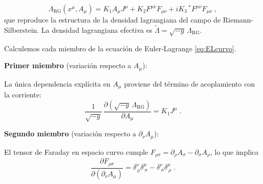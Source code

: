             \begin{equation}\label{eq:LagRS_RG}
                \Lambda_{\text{RG}}(x^{\mu},A_{\mu}) = K_1 A_{\mu}J^{\mu} + K_2 F^{\mu\nu}F_{\mu\nu} + iK_3\,{}^{*}F^{\mu\nu}F_{\mu\nu}\;,
            \end{equation}
            que reproduce la estructura de la densidad lagrangiana del campo de Riemann-Silberstein.  La densidad lagrangiana efectiva es $\tilde{\Lambda} = \sqrt{-g}\,\Lambda_{\text{RG}}$.

            Calculemos cada miembro de la ecuación de Euler-Lagrange \eqref{eq:ELcurvo}.

            \vspace{4pt}
            \noindent\textbf{Primer miembro} (variación respecto a $A_{\mu}$):

            La única dependencia explícita en $A_{\mu}$ proviene del término de acoplamiento
            con la corriente:
            \begin{equation}\label{eq:EL1}
                \frac{1}{\sqrt{-g}}\,
                \frac{\partial(\sqrt{-g}\,\Lambda_{\text{RG}})}{\partial A_{\mu}}
                = K_1 J^{\mu}\;.
            \end{equation}

            \vspace{4pt}
            \noindent\textbf{Segundo miembro} (variación respecto a $\partial_{\nu}A_{\mu}$):

            El tensor de Faraday en espacio curvo cumple $F_{\rho\sigma}=\partial_{\rho}A_{\sigma}
            -\partial_{\sigma}A_{\rho}$, lo que implica
            \begin{equation}\label{eq:dFdA}
                \frac{\partial F_{\rho\sigma}}{\partial(\partial_{\nu}A_{\mu})}
                = \delta^{\nu}_{\ \rho}\delta^{\mu}_{\ \sigma}
                - \delta^{\nu}_{\ \sigma}\delta^{\mu}_{\ \rho}\;.
            \end{equation}

